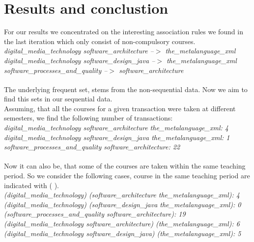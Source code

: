 \section{Results and conclustion}
For our results we concentrated on the interesting association rules we found in the last iteration which only consist of non-compulsory courses.\\
\textit{
digital\_media\_technology software\_architecture --$>$ the\_metalanguage\_xml\\
digital\_media\_technology software\_design\_java --$>$ the\_metalanguage\_xml\\
software\_processes\_and\_quality --$>$ software\_architecture\\
}\\

The underlying frequent set,  stems from the non-sequential data. Now we aim to find this sets in our sequential data.\\

Assuming, that all the courses for a given transaction were taken at different semesters, we find the following number of transactions:\\
\textit{
digital\_media\_technology software\_architecture the\_metalanguage\_xml:    4\\
digital\_media\_technology software\_design\_java  the\_metalanguage\_xml:    1\\
software\_processes\_and\_quality software\_architecture:                   22\\
}\\

Now it can also be, that some of the courses are taken within the same teaching period. So we consider the following cases, course in the same teaching period are indicated with ( ).\\
\textit{
(digital\_media\_technology) (software\_architecture the\_metalanguage\_xml):        4\\
(digital\_media\_technology) (software\_design\_java  the\_metalanguage\_xml):       0\\
(software\_processes\_and\_quality software\_architecture):                          19\\
(digital\_media\_technology software\_architecture) (the\_metalanguage\_xml):        6\\
(digital\_media\_technology software\_design\_java)  (the\_metalanguage\_xml):       5\\
}\\


